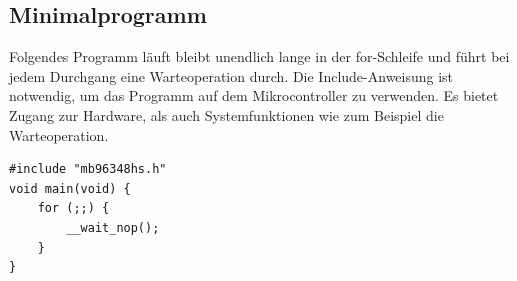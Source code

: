 \documentclass[
  accentcolor=tud1c,	%
  colorbacktitle,		%
  inverttitle,			%
  german,
  twoside
]{tudreport}
\begin{document}
\subsection{Minimalprogramm}
Folgendes Programm läuft bleibt unendlich lange in der for-Schleife und führt bei jedem Durchgang eine Warteoperation durch.
Die Include-Anweisung ist notwendig, um das Programm auf dem Mikrocontroller zu verwenden.
Es bietet Zugang zur Hardware, als auch Systemfunktionen wie zum Beispiel die Warteoperation.
\begin{lstlisting}
#include "mb96348hs.h"
void main(void) {
	for (;;) {
		__wait_nop();
	}
}
\end{lstlisting}
\end{document}
